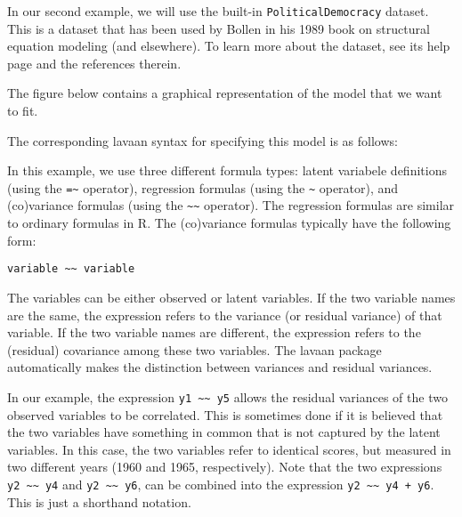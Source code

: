 In our second example, we will use the built-in
\texttt{PoliticalDemocracy} dataset. This is a dataset that has been
used by Bollen in his 1989 book on structural equation modeling (and
elsewhere). To learn more about the dataset, see its help page and the
references therein.

The figure below contains a graphical representation of the model that
we want to fit.

The corresponding lavaan syntax for specifying this model is as follows:

\begin{Shaded}
\begin{Highlighting}[]
\end{Highlighting}
\end{Shaded}

In this example, we use three different formula types: latent variabele
definitions (using the \texttt{=\textasciitilde{}} operator), regression
formulas (using the \texttt{\textasciitilde{}} operator), and
(co)variance formulas (using the
\texttt{\textasciitilde{}\textasciitilde{}} operator). The regression
formulas are similar to ordinary formulas in R. The (co)variance
formulas typically have the following form:

\begin{verbatim}
variable ~~ variable
\end{verbatim}

The variables can be either observed or latent variables. If the two
variable names are the same, the expression refers to the variance (or
residual variance) of that variable. If the two variable names are
different, the expression refers to the (residual) covariance among
these two variables. The lavaan package automatically makes the
distinction between variances and residual variances.

In our example, the expression
\texttt{y1 \textasciitilde{}\textasciitilde{} y5} allows the residual
variances of the two observed variables to be correlated. This is
sometimes done if it is believed that the two variables have something
in common that is not captured by the latent variables. In this case,
the two variables refer to identical scores, but measured in two
different years (1960 and 1965, respectively). Note that the two
expressions \texttt{y2 \textasciitilde{}\textasciitilde{} y4} and
\texttt{y2 \textasciitilde{}\textasciitilde{} y6}, can be combined into
the expression \texttt{y2 \textasciitilde{}\textasciitilde{}~y4 + y6}.
This is just a shorthand notation.

